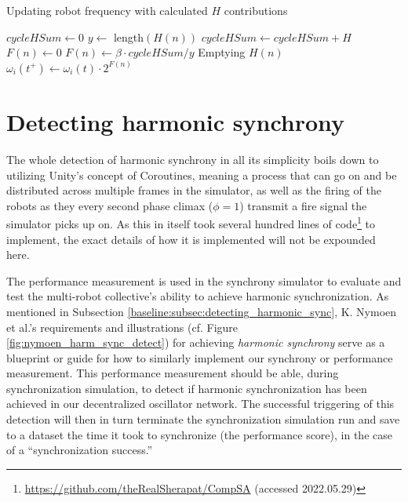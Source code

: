 	\begin{algorithm}
	\caption{Updating robot frequency with calculated $H$ contributions}\label{RFAAdjustFrequency}
	\begin{algorithmic}[1]
		\State $cycleHSum \gets 0$ 
		\State $y \gets$ length$(H(n))$
			\State $cycleHSum \gets cycleHSum + H$
		\EndFor
		\State $F(n) \gets 0$
			\State $F(n) \gets \beta \cdot cycleHSum / y$ 
		\EndIf
		\State Emptying $H(n)$ 
		\State $\omega_i(t^+) \gets \omega_i(t) \cdot 2^{F(n)}$
	\EndProcedure
	\end{algorithmic}
	\end{algorithm}
	
	

\section{Detecting harmonic synchrony}
\label{sec:detecting_harmonic_synchrony}

	The whole detection of harmonic synchrony in all its simplicity boils down to utilizing Unity's concept of Coroutines, meaning a process that can go on and be distributed across multiple frames in the simulator, as well as the firing of the robots as they every second phase climax ($\phi=1$) transmit a fire signal the simulator picks up on. As this in itself took several hundred lines of code\footnote{\url{https://github.com/theRealSherapat/CompSA} (accessed 2022.05.29)} to implement, the exact details of how it is implemented will not be expounded here.

	The performance measurement is used in the synchrony simulator to evaluate and test the multi-robot collective's ability to achieve harmonic synchronization. As mentioned in Subsection \ref{baseline:subsec:detecting_harmonic_sync}, K. Nymoen et al.'s requirements and illustrations (cf. Figure \ref{fig:nymoen_harm_sync_detect}) for achieving \textit{harmonic synchrony} serve as a blueprint or guide for how to similarly implement our synchrony or performance measurement. This performance measurement should be able, during synchronization simulation, to detect if harmonic synchronization has been achieved in our decentralized oscillator network. The successful triggering of this detection will then in turn terminate the synchronization simulation run and save to a dataset the time it took to synchronize (the performance score), in the case of a ``synchronization success.''

